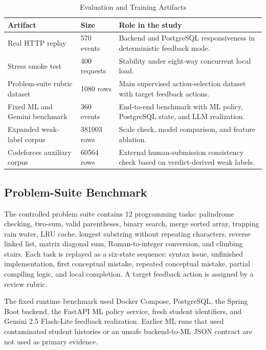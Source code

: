 \documentclass[twoside, 11pt]{article}
\begin{document}
\begin{table}[t]
\centering
\caption{Evaluation and Training Artifacts}
\label{tab:artifacts}
\small
\begin{tabular}{p{38mm}p{22mm}p{77mm}}
\hline
\textbf{Artifact} & \textbf{Size} & \textbf{Role in the study} \\
\hline
Real HTTP replay & 570 events & Backend and PostgreSQL responsiveness in deterministic feedback mode. \\
Stress smoke test & 400 requests & Stability under eight-way concurrent local load. \\
Problem-suite rubric dataset & 1080 rows & Main supervised action-selection dataset with target feedback actions. \\
Fixed ML and Gemini benchmark & 360 events & End-to-end benchmark with ML policy, PostgreSQL state, and LLM realization. \\
Expanded weak-label corpus & 381003 rows & Scale check, model comparison, and feature ablation. \\
Codeforces auxiliary corpus & 60564 rows & External human-submission consistency check based on verdict-derived weak labels. \\
\hline
\end{tabular}
\end{table}

\subsection{Problem-Suite Benchmark}

The controlled problem suite contains 12 programming tasks: palindrome checking, two-sum, valid parentheses, binary search, merge sorted array, trapping rain water, LRU cache, longest substring without repeating characters, reverse linked list, matrix diagonal sum, Roman-to-integer conversion, and climbing stairs. Each task is replayed as a six-state sequence: syntax issue, unfinished implementation, first conceptual mistake, repeated conceptual mistake, partial compiling logic, and local completion. A target feedback action is assigned by a review rubric.

The fixed runtime benchmark used Docker Compose, PostgreSQL, the Spring Boot backend, the FastAPI ML policy service, fresh student identifiers, and Gemini 2.5 Flash-Lite feedback realization. Earlier ML runs that used contaminated student histories or an unsafe backend-to-ML JSON contract are not used as primary evidence.
\end{document}

